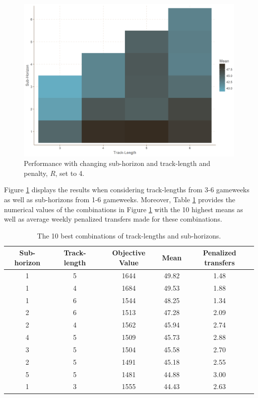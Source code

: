 \begin{figure}[H]
    \centering
    \includegraphics[scale=0.5]{fig/chapter_6/pen_4.png}
    \caption{Performance with changing sub-horizon and track-length and penalty, $R$, set to 4.}
\label{fig:pen_4}    
\end{figure}

Figure \ref{fig:pen_4} displays the results when considering track-lengths from 3-6 gameweeks as well as sub-horizons from 1-6 gameweeks.  Moreover, Table \ref{tab:pen_4_ill_trans} provides the numerical values of the combinations in Figure \ref{fig:pen_4} with the 10 highest means as well as average weekly penalized transfers made for these combinations.




\begin{table}[H]
\centering
\begin{tabular}{|c|c|c|c|c|}
\hline
Sub-horizon & Track-length & Objective Value & Mean & Penalized transfers \\
\hline
1       & 5          & 1644             & 49.82 & 1.48       \\
1       & 4          & 1684             & 49.53 & 1.88       \\
1       & 6          & 1544             & 48.25 & 1.34       \\
2       & 6          & 1513             & 47.28 & 2.09       \\
2       & 4          & 1562             & 45.94 & 2.74       \\
4       & 5          & 1509             & 45.73 & 2.88       \\
3       & 5          & 1504             & 45.58 & 2.70       \\
2       & 5          & 1491             & 45.18 & 2.55       \\
5       & 5          & 1481             & 44.88 & 3.00       \\
1       & 3          & 1555             & 44.43 & 2.63       \\
\hline
\end{tabular}
\caption{The 10 best combinations of track-lengths and sub-horizons.}
\label{tab:pen_4_ill_trans}
\end{table}


